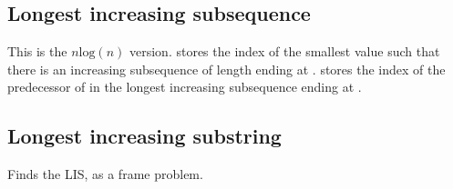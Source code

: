 
\subsection*{Longest increasing subsequence}


%

This is the $n\text{log}(n)$ version.  stores the index  of the smallest value  such that there is an increasing subsequence of length  ending at .  stores the index of the predecessor of  in the longest increasing subsequence ending at .



\subsection*{Longest increasing substring}

Finds the LIS, as a frame problem.




\newpage